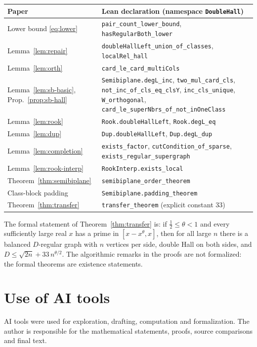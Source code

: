 \documentclass[11pt]{amsart}
\theoremstyle{definition}
\theoremstyle{remark}
\begin{document}
\medskip
\begin{tabular}{>{\raggedright\arraybackslash}p{}>{\raggedright\arraybackslash}p{}}
Paper & Lean declaration (namespace \texttt{DoubleHall})\\\hline
Lower bound \eqref{eq:lower} & \texttt{pair\_count\_lower\_bound}, \texttt{hasRegularBoth\_lower}\\
Lemma~\ref{lem:repair} & \texttt{doubleHallLeft\_union\_of\_classes}, \texttt{localRel\_hall}\\
Lemma~\ref{lem:orth} & \texttt{card\_le\_card\_multiCols}\\
Lemma~\ref{lem:sb-basic}, Prop.~\ref{prop:sb-hall} & \texttt{Semibiplane.degL\_inc}, \texttt{two\_mul\_card\_cls},
  \texttt{not\_inc\_of\_cls\_eq\_clsY}, \texttt{inc\_cls\_unique}, \texttt{W\_orthogonal},
  \texttt{card\_le\_superNbrs\_of\_not\_inOneClass}\\
Lemma~\ref{lem:rook} & \texttt{Rook.doubleHallLeft}, \texttt{Rook.degL\_eq}\\
Lemma~\ref{lem:dup} & \texttt{Dup.doubleHallLeft}, \texttt{Dup.degL\_dup}\\
Lemma~\ref{lem:completion} & \texttt{exists\_factor}, \texttt{cutCondition\_of\_sparse},
  \texttt{exists\_regular\_supergraph}\\
Lemma~\ref{lem:rook-interp} & \texttt{RookInterp.exists\_local}\\
Theorem~\ref{thm:semibiplane} & \texttt{semibiplane\_order\_theorem}\\
Class-block padding & \texttt{Semibiplane.padding\_theorem}\\
Theorem~\ref{thm:transfer} & \texttt{transfer\_theorem} (explicit constant $33$)\\
\end{tabular}

\medskip
The formal statement of Theorem~\ref{thm:transfer} is: if $\tfrac12\le\theta<1$ and every
sufficiently large real $x$ has a prime in $[x-x^\theta,x]$, then for all large $n$ there is a
balanced $D$-regular graph with $n$ vertices per side, double Hall on both sides, and
$D\le\sqrt{2n}+33\,n^{\theta/2}$. The algorithmic remarks in the proofs are not formalized: the
formal theorems are existence statements.

\section*{Use of AI tools}
AI tools were used for exploration, drafting, computation and formalization. The author
is responsible for the mathematical statements, proofs, source comparisons and final text.
\end{document}

